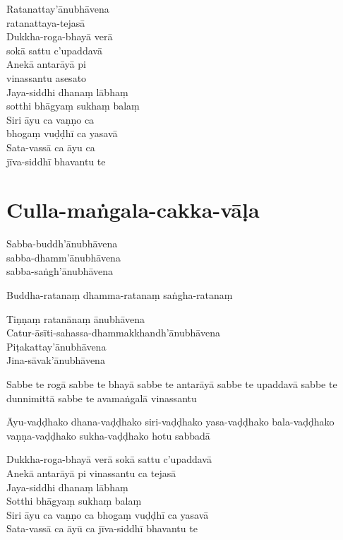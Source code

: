 
\begin{paritta}
  Ratanattay'ānubhāvena\\\vin ratanattaya-tejasā\\
  Dukkha-roga-bhayā verā\\\vin sokā sattu c'upaddavā\\
  Anekā antarāyā pi\\\vin vinassantu asesato\\
  Jaya-siddhi dhanaṃ lābhaṃ\\\vin sotthi bhāgyaṃ sukhaṃ balaṃ\\
  Siri āyu ca vaṇṇo ca\\\vin bhogaṃ vuḍḍhī ca yasavā\\
  Sata-vassā ca āyu ca\\\vin jīva-siddhī bhavantu te
\end{paritta}

\clearpage

\section{Culla-maṅgala-cakka-vāḷa}

\enlargethispage{\baselineskip}


Sabba-buddh'ānubhāvena\\
sabba-dhamm'ānubhāvena\\
sabba-saṅgh'ānubhāvena

Buddha-ratanaṃ dhamma-ratanaṃ saṅgha-ratanaṃ

Tiṇṇaṃ ratanānaṃ ānubhāvena\\
Catur-āsīti-sahassa-dhammakkhandh'ānubhāvena\\
Piṭakattay'ānubhāvena\\
Jina-sāvak'ānubhāvena

Sabbe te rogā sabbe te bhayā sabbe te antarāyā sabbe te upaddavā sabbe te
dunnimittā sabbe te avamaṅgalā vinassantu

Āyu-vaḍḍhako dhana-vaḍḍhako siri-vaḍḍhako yasa-vaḍḍhako bala-vaḍḍhako
vaṇṇa-vaḍḍhako sukha-vaḍḍhako hotu sabbadā

Dukkha-roga-bhayā verā sokā sattu c'upaddavā\\
Anekā antarāyā pi vinassantu ca tejasā\\
Jaya-siddhi dhanaṃ lābhaṃ\\
Sotthi bhāgyaṃ sukhaṃ balaṃ\\
Siri āyu ca vaṇṇo ca bhogaṃ vuḍḍhī ca yasavā\\
Sata-vassā ca āyū ca jīva-siddhī bhavantu te

